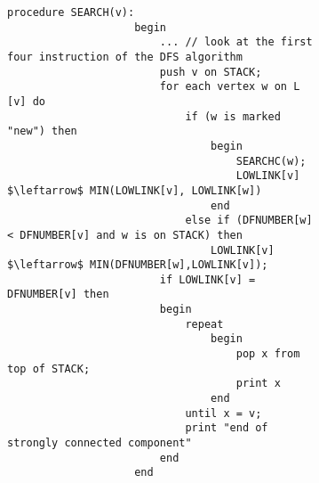 \documentclass{subfiles}
\begin{document}
\begin{figure}[!h]
    \centering
    \begin{subfigure}[b]{0.9\textwidth}
        \begin{lstlisting}[language = algol]
                procedure SEARCH(v):
                    begin
                        ... // look at the first four instruction of the DFS algorithm
                        push v on STACK;
                        for each vertex w on L [v] do
                            if (w is marked "new") then
                                begin
                                    SEARCHC(w);
                                    LOWLINK[v] $\leftarrow$ MIN(LOWLINK[v], LOWLINK[w])
                                end
                            else if (DFNUMBER[w] < DFNUMBER[v] and w is on STACK) then
                                LOWLINK[v] $\leftarrow$ MIN(DFNUMBER[w],LOWLINK[v]);
                        if LOWLINK[v] = DFNUMBER[v] then
                        begin
                            repeat
                                begin
                                    pop x from top of STACK;
                                    print x
                                end
                            until x = v;
                            print "end of strongly connected component"
                        end
                    end
            \end{lstlisting}
    \end{subfigure}
\end{figure}
\end{document}
